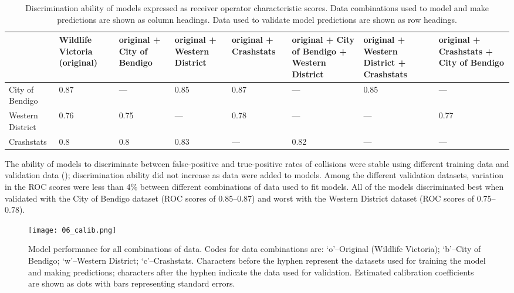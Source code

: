 \begin{table}[!t]
\caption[Discrimination ability of models using all combinations of independent data]{Discrimination ability of models expressed as receiver operator characteristic scores. Data combinations used to model and make predictions are shown as column headings. Data used to validate model predictions are shown as row headings.}
\centering
\begin{tabularx}{0.9\textwidth}{YYYYYYYY} \toprule
	& Wildlife Victoria
(original) & original + City of Bendigo & original + Western District & original + Crashstats & original + City of Bendigo + Western District & original + Western District + Crashstats & original + Crashstats + City of Bendigo \\ 
  \midrule
City of Bendigo & 0.87 & --- & 0.85 & 0.87 & --- & 0.85 & --- \\ 
Western District & 0.76 & 0.75 & --- & 0.78 & --- & --- & 0.77 \\ 
Crashstats & 0.8 & 0.8 & 0.83 & --- & 0.82 & --- & --- \\
\bottomrule
\end{tabularx}
\label{val_glm_roc}
\end{table}

The ability of models to discriminate between false-positive and true-positive rates of collisions were stable using different training data and validation data (); discrimination ability did not increase as data were added to models. Among the different validation datasets, variation in the ROC scores were less than 4\% between different combinations of data used to fit models. All of the models discriminated best when validated with the City of Bendigo dataset (ROC scores of 0.85--0.87) and worst with the Western District dataset (ROC scores of 0.75--0.78). 

\begin{figure*}[!t]
  \centering
  \texttt{[image: 06\_calib.png]}
  \caption[Model calibration for all combinations of original and independent data]{Model performance for all combinations of data. Codes for data combinations are: `o'--Original (Wildlife Victoria); `b'--City of Bendigo; `w'--Western District; `c'--Crashstats. Characters before the hyphen represent the datasets used for training the model and making predictions; characters after the hyphen indicate the data used for validation. Estimated calibration coefficients are shown as dots with bars representing standard errors.}
  \label{val_calib}
\end{figure*}

